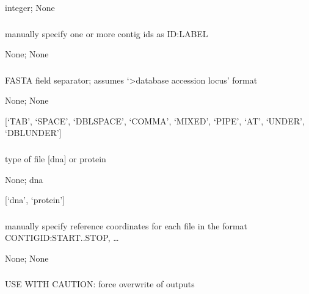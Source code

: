 \documentclass[letterpaper,11pt,english]{sphinxmanual}
\begin{document}
 integer;  None


\subsubsection{}
\label{\detokenize{prog_desc:contig-ids-contigids}}
 manually specify one or more contig ids as ID:LABEL

 None;  None


\subsubsection{}
\label{\detokenize{prog_desc:field-sep-fieldsep}}
 FASTA field separator; assumes ‘\textgreater{}database accession locus’ format

 None;  None

 {[}‘TAB’, ‘SPACE’, ‘DBLSPACE’, ‘COMMA’, ‘MIXED’, ‘PIPE’, ‘AT’, ‘UNDER’, ‘DBLUNDER’{]}


\subsubsection{}
\label{\detokenize{prog_desc:flavor}}
 type of file {[}dna{]} or protein

 None;  dna

 {[}‘dna’, ‘protein’{]}


\subsubsection{}
\label{\detokenize{prog_desc:manual-coord-manualcoord}}
 manually specify reference coordinates for each file in the format CONTIGID:START..STOP, …

 None;  None


\subsubsection{}
\label{\detokenize{prog_desc:id5}}
 USE WITH CAUTION: force overwrite of outputs
\end{document}
